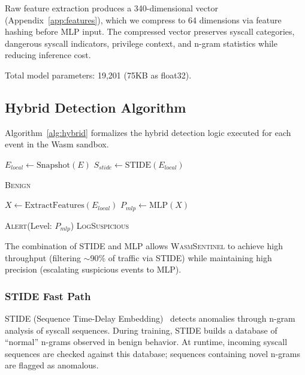 Raw feature extraction produces a 340-dimensional vector (Appendix~\ref{app:features}), which we compress to 64 dimensions via feature hashing before MLP input.
The compressed vector preserves syscall categories, dangerous syscall indicators, privilege context, and n-gram statistics while reducing inference cost.

Total model parameters: 19,201 (75KB as float32).

\subsection{Hybrid Detection Algorithm}
\label{sec:design-algorithm}

Algorithm~\ref{alg:hybrid} formalizes the hybrid detection logic executed for each event in the Wasm sandbox.

\begin{algorithm}[h]
\caption{Hybrid Threat Detection Logic}
\label{alg:hybrid}
\begin{algorithmic}[1]
    \State $E_{local} \gets \text{Snapshot}(E)$ 
    \State $S_{stide} \gets \text{STIDE}(E_{local})$ 
    
     
        \State \Return \textsc{Benign}
    \EndIf
    
    \State $X \gets \text{ExtractFeatures}(E_{local})$ 
    \State $P_{mlp} \gets \text{MLP}(X)$ 
    
     
        \State \Return \textsc{Alert}(Level: $P_{mlp}$)
    \Else
        \State \Return \textsc{LogSuspicious} 
    \EndIf
\EndProcedure
\end{algorithmic}
\end{algorithm}

The combination of STIDE and MLP allows \textsc{WasmSentinel} to achieve high throughput (filtering $\sim$90\% of traffic via STIDE) while maintaining high precision (escalating suspicious events to MLP).

\subsubsection{STIDE Fast Path}

STIDE (Sequence Time-Delay Embedding)~\cite{stide} detects anomalies through n-gram analysis of syscall sequences.
During training, STIDE builds a database of ``normal'' n-grams observed in benign behavior.
At runtime, incoming syscall sequences are checked against this database; sequences containing novel n-grams are flagged as anomalous.

